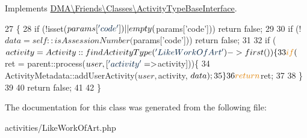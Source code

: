 Implements \hyperlink{interfaceDMA_1_1Friends_1_1Classes_1_1ActivityTypeBaseInterface}{D\-M\-A\textbackslash{}\-Friends\textbackslash{}\-Classes\textbackslash{}\-Activity\-Type\-Base\-Interface}.


\begin{DoxyCode}
27     \{
28         \textcolor{keywordflow}{if} (!isset($params[\textcolor{stringliteral}{'code'}]) || empty($params[\textcolor{stringliteral}{'code'}])) \textcolor{keywordflow}{return} \textcolor{keyword}{false};
29 
30         \textcolor{keywordflow}{if} (!$data = self::isAssessionNumber($params[\textcolor{stringliteral}{'code'}])) \textcolor{keywordflow}{return} \textcolor{keyword}{false};
31 
32         \textcolor{keywordflow}{if} ($activity = Activity::findActivityType(\textcolor{stringliteral}{'LikeWorkOfArt'})->first()) \{          
33             \textcolor{keywordflow}{if}($ret = parent::process($user, [\textcolor{stringliteral}{'activity'} => $activity]))\{
34                 ActivityMetadata::addUserActivity($user, $activity, $data);
35             \}
36             \textcolor{keywordflow}{return} $ret;
37             
38         \}
39 
40         \textcolor{keywordflow}{return} \textcolor{keyword}{false};
41 
42     \}
\end{DoxyCode}


The documentation for this class was generated from the following file\-:\begin{DoxyCompactItemize}
\item 
activities/Like\-Work\-Of\-Art.\-php\end{DoxyCompactItemize}
